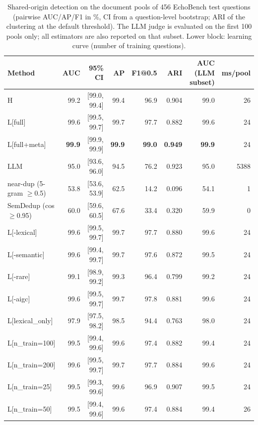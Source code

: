 \begin{table}[tbp]
\centering
\small
\caption{Shared-origin detection on the document pools of 456 EchoBench test questions (pairwise AUC/AP/F1 in \%, CI from a question-level bootstrap; ARI of the clustering at the default threshold). The LLM judge is evaluated on the first 100 pools only; all estimators are also reported on that subset. Lower block: learning curve (number of training questions).}
\label{tab:dep}
\setlength{\tabcolsep}{4pt}
\begin{tabular}{lrrrrrrr}
\toprule
Method & AUC & 95\% CI & AP & F1@0.5 & ARI & AUC (LLM subset) & ms/pool \\
\midrule
H & 99.2 & [99.0, 99.4] & 99.4 & 96.9 & 0.904 & 99.0 & 26 \\
L[full] & 99.6 & [99.5, 99.7] & 99.7 & 97.7 & 0.882 & 99.6 & 24 \\
L[full+meta] & \textbf{99.9} & [99.9, 99.9] & \textbf{99.9} & \textbf{99.0} & \textbf{0.949} & \textbf{99.9} & 24 \\
LLM & 95.0 & [93.6, 96.0] & 94.5 & 76.2 & 0.923 & 95.0 & 5388 \\
near-dup (5-gram $\geq$0.5) & 53.8 & [53.6, 53.9] & 62.5 & 14.2 & 0.096 & 54.1 & 1 \\
SemDedup (cos $\geq$0.95) & 60.0 & [59.6, 60.5] & 67.6 & 33.4 & 0.320 & 59.9 & 0 \\
L[-lexical] & 99.6 & [99.5, 99.7] & 99.7 & 97.7 & 0.880 & 99.6 & 24 \\
L[-semantic] & 99.6 & [99.4, 99.7] & 99.7 & 97.6 & 0.872 & 99.5 & 24 \\
L[-rare] & 99.1 & [98.9, 99.2] & 99.3 & 96.4 & 0.799 & 99.2 & 24 \\
L[-aigc] & 99.6 & [99.5, 99.7] & 99.7 & 97.8 & 0.881 & 99.6 & 24 \\
L[lexical\_only] & 97.9 & [97.5, 98.2] & 98.5 & 94.4 & 0.763 & 98.0 & 24 \\
\midrule
L[n\_train=100] & 99.5 & [99.4, 99.6] & 99.6 & 97.4 & 0.882 & 99.4 & 24 \\
L[n\_train=200] & 99.6 & [99.5, 99.7] & 99.7 & 97.7 & 0.884 & 99.6 & 24 \\
L[n\_train=25] & 99.5 & [99.3, 99.6] & 99.6 & 96.9 & 0.907 & 99.5 & 24 \\
L[n\_train=50] & 99.5 & [99.4, 99.6] & 99.6 & 97.4 & 0.884 & 99.4 & 26 \\
\bottomrule
\end{tabular}
\end{table}

